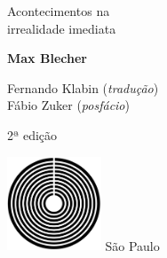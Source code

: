 




\begingroup\thispagestyle{empty}\vspace*{.05\textheight} 

              \formular
              
              \LARGE\noindent
              Acontecimentos na\\ 
              irrealidade imediata

                      

              \bigskip  
              
              \Large\noindent\textbf{Max Blecher}

              \vfill
              {\fontsize{30}{40}%
              \small\noindent 
              Fernando Klabin (\textit{tradução})\vspace{-0.3em}\\
              \noindent
              Fábio Zuker (\textit{posfácio})}
              
              \bigskip

              \noindent
              {\fontsize{30}{40}%
              \small\noindent 2ª edição}
              

              \vfill\noindent\includegraphics[width=0.21\textwidth]{logo}
              \break{} 
              \smallskip
              {\fontsize{30}{40}%
              \scriptsize\noindent{}São Paulo\quad\the\year}

\endgroup
\pagebreak
